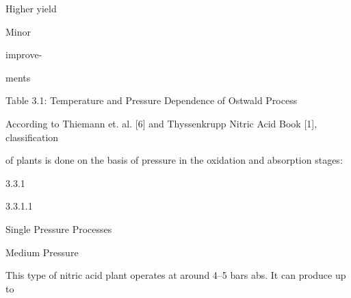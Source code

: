\documentclass[a4paper,portrait,12pt]{article}
\begin{document}
\begin{flushleft}
Higher yield
\end{flushleft}





\begin{flushleft}
Minor
\end{flushleft}





\begin{flushleft}
improve-
\end{flushleft}





\begin{flushleft}
ments
\end{flushleft}





\begin{flushleft}
Table 3.1: Temperature and Pressure Dependence of Ostwald Process
\end{flushleft}





\begin{flushleft}
According to Thiemann et. al. [6] and Thyssenkrupp Nitric Acid Book [1], classification
\end{flushleft}


\begin{flushleft}
of plants is done on the basis of pressure in the oxidation and absorption stages:
\end{flushleft}





3.3.1


3.3.1.1





\begin{flushleft}
Single Pressure Processes
\end{flushleft}


\begin{flushleft}
Medium Pressure
\end{flushleft}





\begin{flushleft}
This type of nitric acid plant operates at around 4--5 bars abs. It can produce up to
\end{flushleft}
\end{document}
